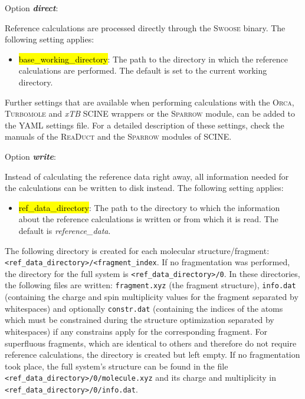 \documentclass[]{tufte-book}
\begin{document}
Option \textit{\textbf{direct}}:

Reference calculations are processed directly through the \textsc{Swoose} binary. The following setting applies:

\begin{itemize}
\item \hl{base\_working\_directory}: The path to the directory in which the reference calculations are performed. The default is set to the current working directory.
\end{itemize}

Further settings that are available when performing calculations with the \textsc{Orca}, \textsc{Turbomole} and \textit{xTB} SCINE wrappers or the \textsc{Sparrow} module, can be added to the YAML settings file. For a detailed description of these settings, check the manuals of the \textsc{ReaDuct}\cite{readuct} and the \textsc{Sparrow}\cite{sparrow_zenodo} modules of SCINE.

\medskip
Option \textit{\textbf{write}}:

Instead of calculating the reference data right away, all information needed for the calculations can be written to disk instead. The following setting applies:

\begin{itemize}
\item \hl{ref\_data\_directory}: The path to the directory to which the information about the reference calculations is written or from which it is read. The default is \textit{reference\_data}.
\end{itemize}

The following directory is created for each molecular structure/fragment: \texttt{<ref\_data\_directory>/<fragment\_index}. If no fragmentation was performed, the directory for the full system is \texttt{<ref\_data\_directory>/0}. In these directories, the following files are written: \texttt{fragment.xyz} (the fragment structure), \texttt{info.dat} (containing the charge and spin multiplicity values for the fragment separated by whitespaces) and optionally \texttt{constr.dat} (containing the indices of the atoms which must be constrained during the structure optimization separated by whitespaces) if any constrains apply for the corresponding fragment. For superfluous fragments, which are identical to others and therefore do not require reference calculations, the directory is created but left empty. If no fragmentation took place, the full system's structure can be found in the file \texttt{<ref\_data\_directory>/0/molecule.xyz} and its charge and multiplicity in \texttt{<ref\_data\_directory>/0/info.dat}.
\end{document}
